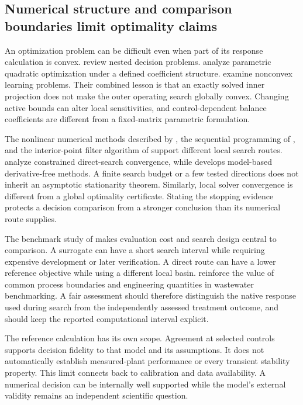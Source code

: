 \subsection{Numerical structure and comparison boundaries limit optimality claims}

An optimization problem can be difficult even when part of its response calculation is convex. \citet{Colson2007} review nested decision problems. \citet{Tondel2003} analyze parametric quadratic optimization under a defined coefficient structure. \citet{JainKar2017} examine nonconvex learning problems. Their combined lesson is that an exactly solved inner projection does not make the outer operating search globally convex. Changing active bounds can alter local sensitivities, and control-dependent balance coefficients are different from a fixed-matrix parametric formulation.

The nonlinear numerical methods described by \citet{BuzziFerraris2013}, the sequential programming of \citet{Kraft1988}, and the interior-point filter algorithm of \citet{WachterBiegler2006} support different local search routes. \citet{AudetDennis2006} analyze constrained direct-search convergence, while \citet{Ragonneau2022} develops model-based derivative-free methods. A finite search budget or a few tested directions does not inherit an asymptotic stationarity theorem. Similarly, local solver convergence is different from a global optimality certificate. Stating the stopping evidence protects a decision comparison from a stronger conclusion than its numerical route supplies.

The benchmark study of \citet{Bliek2023} makes evaluation cost and search design central to comparison. A surrogate can have a short search interval while requiring expensive development or later verification. A direct route can have a lower reference objective while using a different local basin. \citet{Zhang2026} reinforce the value of common process boundaries and engineering quantities in wastewater benchmarking. A fair assessment should therefore distinguish the native response used during search from the independently assessed treatment outcome, and should keep the reported computational interval explicit.

The reference calculation has its own scope. Agreement at selected controls supports decision fidelity to that model and its assumptions. It does not automatically establish measured-plant performance or every transient stability property. This limit connects back to calibration and data availability. A numerical decision can be internally well supported while the model's external validity remains an independent scientific question.

